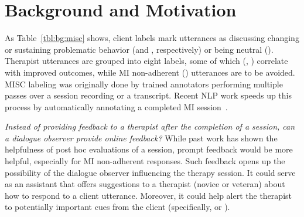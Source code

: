 \section{Background and Motivation}
\label{sec:snt:background}
As Table~\ref{tbl:bg:misc} shows, client labels mark utterances as
discussing changing or sustaining problematic behavior (\CHANGE and
\SUSTAIN, respectively) or being neutral (\FN). Therapist utterances
are grouped into eight labels, some of which (\RES, \REC) correlate
with improved outcomes, while MI non-adherent (\MIN) utterances are to
be avoided.  MISC labeling was originally done by trained annotators
performing multiple passes over a session recording or a transcript.
Recent NLP work speeds up this process by automatically annotating a
completed MI session~\citep[\eg,][]{tanana2016comparison,
  xiao2016behavioral, perez2017predicting}.

\emph{Instead of providing feedback to a therapist after the
  completion of a session, can a dialogue observer provide online
  feedback?} While past work has shown the helpfulness of post hoc
evaluations of a session, prompt feedback would be more helpful,
especially for MI non-adherent responses.  Such feedback opens up
the possibility of the dialogue observer influencing the therapy
session. It could serve as an assistant that offers suggestions to a
therapist (novice or veteran) about how to respond to a client
utterance. Moreover, it could help alert the therapist to
potentially important cues from the client (specifically, \CHANGE or
\SUSTAIN). %




